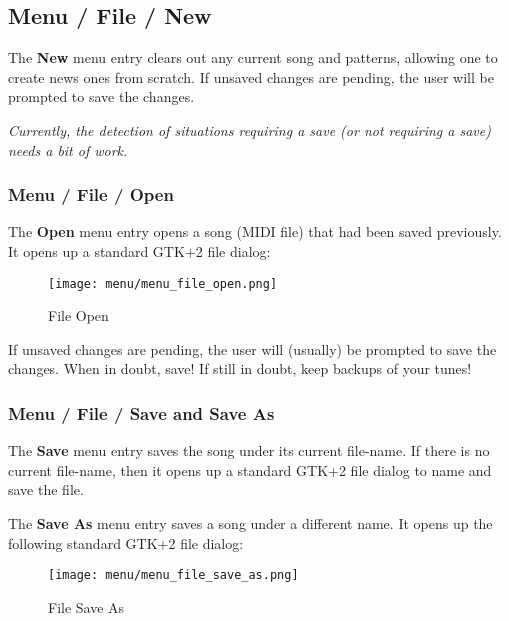 \subsection{Menu / File / New}
\label{subsec:menu_file_new}

   The \textbf{New} menu entry clears out any current song and patterns,
   allowing one to create news ones from scratch.
   If unsaved changes are pending, the user will be prompted to save the
   changes.

   \textsl{Currently, the detection of situations requiring a save (or not
   requiring a save) needs a bit of work.}

\subsubsection{Menu / File / Open}
\label{subsubsec:seq64_menu_file_open}

   The \textbf{Open} menu entry opens a song (MIDI file)
   that had been saved previously.  It opens up a standard GTK+2 file dialog:

\begin{figure}[H]
   \centering 
   \texttt{[image: menu/menu\_file\_open.png]}
   \caption{File Open}
   \label{fig:seq64_menu_file_open}
\end{figure}

   If unsaved changes are pending, the user will (usually)
   be prompted to save the changes.  When in doubt, save!
   If still in doubt, keep backups of your tunes!

\subsubsection{Menu / File / Save and Save As}
\label{subsubsec:menu_file_open_save_as}

   The \textbf{Save} menu entry saves the song under its current file-name.
   If there is no current file-name, then it opens up a standard GTK+2 file
   dialog to name and save the file.

   The \textbf{Save As} menu entry saves a song under a different name.
   It opens up the following standard GTK+2 file dialog:

\begin{figure}[H]
   \centering 
   \texttt{[image: menu/menu\_file\_save\_as.png]}
   \caption{File Save As}
   \label{fig:seq64_menu_file_save_as}
\end{figure}

